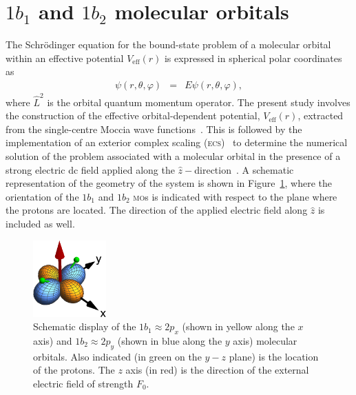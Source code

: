
\section{$1b_{1}$ and $1b_{2}$ molecular orbitals}
\label{ch:1b1_1b2}

The Schr\"{o}dinger equation for the bound-state problem of a
molecular orbital within an effective potential $V_{\mathrm{eff}}(r)$
is expressed in spherical polar coordinates as
%
\begin{eqnarray}
  [ -\frac{1}{2} (\frac{\partial^{2}}{\partial r^{2}} +
    \frac{2}{r} \frac{\partial}{\partial r}) +
    \frac{\hat{L}^2}{2r^2} + V_{\rm{eff}}(r) ] \psi(r,\theta,\varphi)
  & = & E\psi(r,\theta,\varphi),
\label{eq:sch_noCS}
\end{eqnarray}
%
where $\hat{L}^{2}$ is the orbital quantum momentum operator. The
present study involves the construction of the effective
orbital-dependent potential, $V_{\mathrm{eff}}(r)$, extracted from the
single-centre Moccia wave functions~\cite{Moccia_1964}. This is
followed by the implementation of an exterior complex scaling
(\textsc{ecs})~\cite{Simon_1979} to determine the numerical solution
of the problem associated with a molecular orbital in the presence of
a strong electric dc field applied along the
$\hat{z}-$direction~\cite{sarias_2016}. A schematic representation of
the geometry of the system is shown in Figure~\ref{fig:h2o_1b1_1b2},
where the orientation of the $1b_{1}$ and $1b_{2}$ \textsc{mo}s is
indicated with respect to the plane where the protons are located. The
direction of the applied electric field along $\hat{z}$ is included as
well.

\begin{figure}
  \centering
  \includegraphics[width=0.25\textwidth]{figures/ch_H2O/1b1_1b2/orbitals.eps}
  \caption{Schematic display of the $1b_{1}\approx 2p_{x}$ (shown in
    yellow along the $x$ axis) and $1b_{2}\approx 2p_{y}$ (shown in
    blue along the $y$ axis) molecular orbitals. Also indicated (in
    green on the $y-z$ plane) is the location of the protons. The $z$
    axis (in red) is the direction of the external electric field of
    strength $F_{0}$.}
  \label{fig:h2o_1b1_1b2}
\end{figure}


